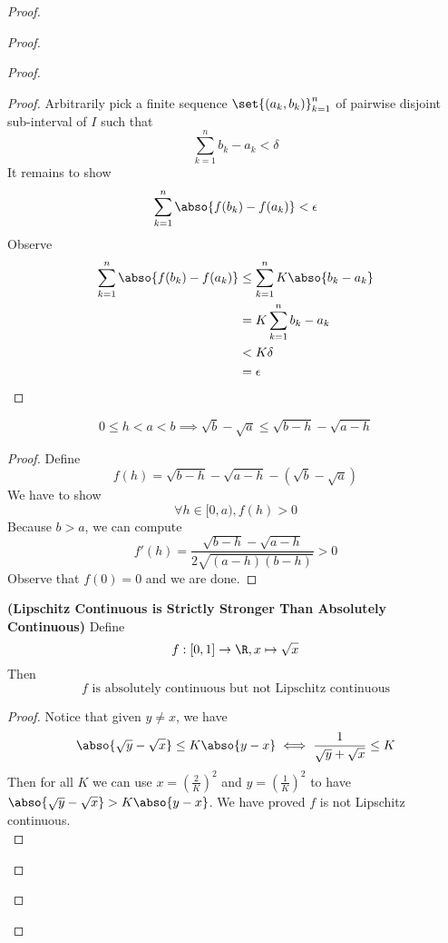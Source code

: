 \documentclass{report}
\begin{document}
\begin{proof}
\begin{proof}
\begin{proof}
\begin{proof}
Arbitrarily pick a finite sequence $\set{(a_k,b_k)}_{k=1}^n $ of pairwise disjoint sub-interval of $I$ such that 
 \begin{equation*}
\sum_{k=1}^n b_k-a_k<\delta
\end{equation*}
It remains to show 
\begin{equation*}
\sum_{k=1}^n \abso{f(b_k)-f(a_k)}<\epsilon 
\end{equation*}
Observe
\begin{align*}
  \sum_{k=1}^n \abso{f(b_k)-f(a_k)}&\leq \sum_{k=1}^n K \abso{b_k-a_k}\\
  &=K \sum_{k=1}^n b_k-a_k\\
  &<K\delta\\
  &=\epsilon 
\end{align*}
\end{proof}
\begin{lemma}
\label{5.5.7}
\begin{equation*}
0\leq h<a<b\implies \sqrt{b}-\sqrt{a}\leq \sqrt{b-h}-\sqrt{a-h} 
\end{equation*}
\end{lemma}
\begin{proof}
Define 
\begin{equation*}
f(h)=\sqrt{b-h} -\sqrt{a-h} -(\sqrt{b} -\sqrt{a} )   
\end{equation*}
We have to show 
\begin{equation*}
\forall h\in [0,a), f(h)>0
\end{equation*}
Because $b>a$, we can compute
\begin{equation*}
f'(h)=\frac{\sqrt{b-h} -\sqrt{a-h} }{2\sqrt{(a-h)(b-h)} }>0
\end{equation*}
Observe that $f(0)=0$ and we are done.
\end{proof}
\begin{theorem}
\label{5.5.8}
\textbf{(Lipschitz Continuous is Strictly Stronger Than Absolutely Continuous)} Define 
 \begin{equation*}
f:[0,1]\rightarrow \R, x\mapsto \sqrt{x} 
\end{equation*}
Then
\begin{equation*}
f\text{ is absolutely continuous but not Lipschitz continuous}
\end{equation*}
\end{theorem}
\begin{proof}
Notice that given $y\neq x$, we have 
\begin{equation*}
\abso{\sqrt{y}  -\sqrt{x} }\leq K \abso{y-x}\iff  \frac{1}{\sqrt{y} +\sqrt{x} }\leq K 
\end{equation*}
Then for all $K$ we can use  $x=(\frac{2}{K})^2$ and $y=(\frac{1}{K})^2$ to have $\abso{\sqrt{y} -\sqrt{x} }> K \abso{y-x}$. We have proved $f$ is not Lipschitz continuous.\\


\end{proof}
\end{proof}
\end{proof}
\end{proof}
\end{document}
